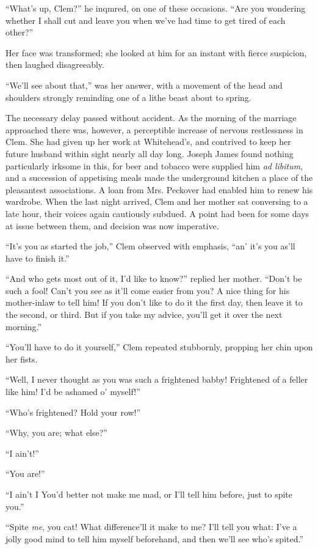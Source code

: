 ``What's up, Clem?'' he inqmred, on one of these occasions. ``Are you
wondering whether I shall cut and leave you when we've had time to get
tired of each other?''

Her face was transformed; she looked at him for an instant with fierce
suspicion, then laughed disagreeably.

``We'll see about that,'' was her answer, with a movement of the head
and shoulders strongly reminding one of a lithe beast about to spring.

The necessary delay passed without accident. As the morning of the
marriage approached there was, however, a perceptible increase of
nervous restlessness in Clem. She had given up her work at Whitehead's,
and contrived to keep her future husband within sight nearly all day
long. Joseph James found nothing particularly irksome in this, for beer
and tobacco were supplied him \emph{ad libitum}, and a succession of
appetising {}meals made the underground kitchen a place of the
pleasantest associations. A loan from Mrs. Peckover had enabled him to
renew his wardrobe. When the last night arrived, Clem and her mother sat
conversing to a late hour, their voices again cautiously subdued. A
point had been for some days at issue between them, and decision was now
imperative.

``It's you as started the job,'' Clem observed with emphasis, ``an' it's
you as'll have to finish it.''

``And who gets most out of it, I'd like to know?'' replied her mother.
``Don't be such a fool! Can't you see as it'll come easier from you? A
nice thing for his mother-inlaw to tell him! If you don't like to do it
the first day, then leave it to the second, or third. But if you take my
advice, you'll get it over the next morning.''

``You'll have to do it yourself,'' Clem repeated stubbornly, propping
her chin upon her fists.

``Well, I never thought as you was such a {}frightened babby! Frightened
of a feller like him! I'd be ashamed o' myself!''

``Who's frightened? Hold your row!''

``Why, you are; what else?''

``I ain't!''

``You are!''

``I ain't I You'd better not make me mad, or I'll tell him before, just
to spite you.''

``Spite \emph{me}, you cat! What difference'll it make to me? I'll tell
you what: I've a jolly good mind to tell him myself beforehand, and then
we'll see who's spited.''

